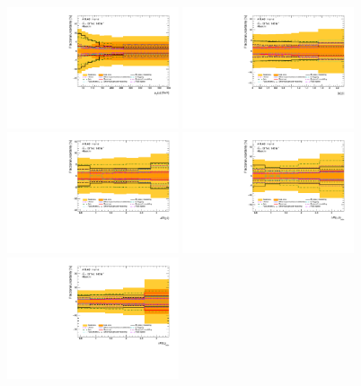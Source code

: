 \begin{figure}[ht]
  \centering
  \includegraphics[width=0.45\textwidth]{figures/diff_xsec/groupedimpact-absolute-xsec/tty_total_SL/Uncertainty_tty_pt.pdf}%
  \includegraphics[width=0.45\textwidth]{figures/diff_xsec/groupedimpact-absolute-xsec/tty_total_SL/Uncertainty_tty_eta.pdf}\\%
  \includegraphics[width=0.45\textwidth]{figures/diff_xsec/groupedimpact-absolute-xsec/tty_total_SL/Uncertainty_tty_drphl.pdf} %
  \includegraphics[width=0.45\textwidth]{figures/diff_xsec/groupedimpact-absolute-xsec/tty_total_SL/Uncertainty_tty_drphb.pdf}\\%
  \includegraphics[width=0.45\textwidth]{figures/diff_xsec/groupedimpact-absolute-xsec/tty_total_SL/Uncertainty_tty_drlj.pdf}%

\end{figure}
